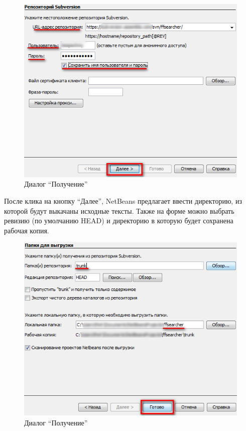 \documentclass[a4paper,12pt]{article}
\begin{document}
\begin{figure}[h!]
	\centering
	\includegraphics[scale=0.90]{netbeans-checkout-2.png}
	\vspace{-10pt}
	\caption{Диалог ``Получение''}
\end{figure}

После клика на кнопку ``Далее'', NetBeans предлагает ввести директорию,
из которой будут выкачаны исходные тексты. Также на форме можно выбрать
ревизию (по умолчанию HEAD) и директорию в которую будет сохранена
рабочая копия.

\begin{figure}[h!]
	\centering
	\includegraphics[scale=0.90]{netbeans-checkout-3.png}
	\vspace{-10pt}
	\caption{Диалог ``Получение''}
\end{figure}
\end{document}
